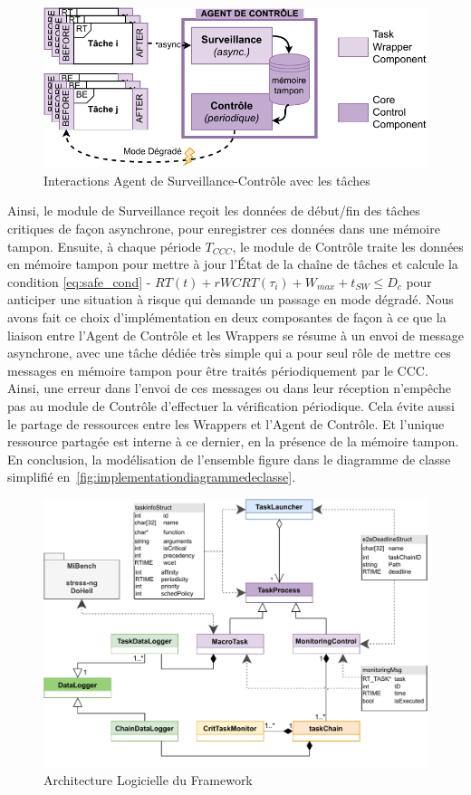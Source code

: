 \documentclass[french, a4paper, 11pt, twoside, pdftex]{StyleThese}
\begin{document}
	\begin{figure}[ht]
		\centering
		\includegraphics[width=0.8\linewidth]{schemas/AgentSurveillance_Controle}
		\caption{Interactions Agent de Surveillance-Contrôle avec les tâches}
		\label{fig:agentsurveillancecontrole}
	\end{figure}
	Ainsi, le module de Surveillance reçoit les données de début/fin des tâches critiques de façon asynchrone, pour enregistrer ces données dans une mémoire tampon. Ensuite, à chaque période $T_{CCC}$, le module de Contrôle traite les données en mémoire tampon pour mettre à jour l’État de la chaîne de tâches et calcule la condition \autoref{eq:safe_cond} - $ RT(t) + rWCRT(\tau_i) + W_{max} + t_{SW} \leq D_c $ pour anticiper une situation à risque qui demande un passage en mode dégradé.
	Nous avons fait ce choix d'implémentation en deux composantes de façon à ce que la liaison entre l'Agent de Contrôle et les Wrappers se résume à un envoi de message asynchrone, avec une tâche dédiée très simple qui a pour seul rôle de mettre ces messages en mémoire tampon pour être traités périodiquement par le CCC. Ainsi, une erreur dans l'envoi de ces messages ou dans leur réception n'empêche pas au module de Contrôle d'effectuer la vérification périodique. Cela évite aussi le partage de ressources entre les Wrappers et l'Agent de Contrôle. Et l'unique ressource partagée est interne à ce dernier, en la présence de la mémoire tampon. En conclusion, la modélisation de l'ensemble figure dans le diagramme de classe simplifié en~\autoref{fig:implementationdiagrammedeclasse}.
	
	\pagebreak
	
	\begin{figure}[ht]
		\centering
		\includegraphics[width=\linewidth]{schemas/Implementation_DiagrammeDeClasse}
		\caption{Architecture Logicielle du Framework}
		\label{fig:implementationdiagrammedeclasse}
	\end{figure}
    
\end{document}
